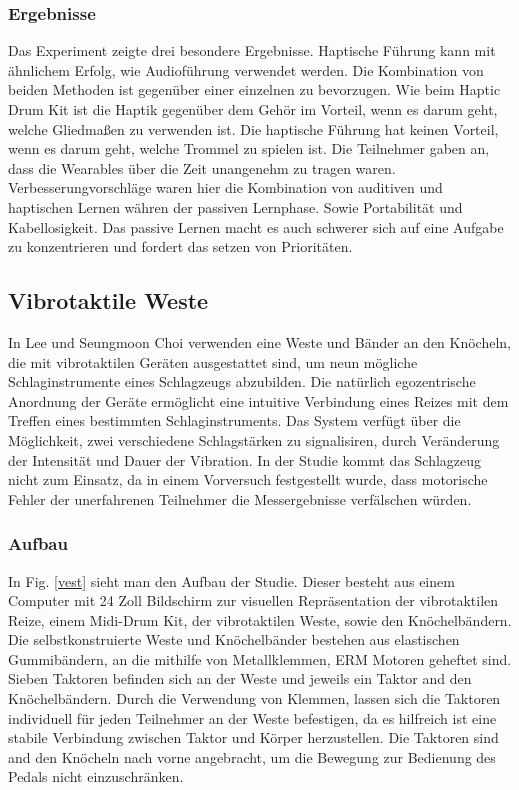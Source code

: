 \documentclass[ngerman,runningheads,a4paper]{llncs}
\begin{document}
\subsubsection{Ergebnisse}
Das Experiment zeigte drei besondere Ergebnisse.
Haptische Führung kann mit ähnlichem Erfolg, wie Audioführung verwendet werden.
Die Kombination von beiden Methoden ist gegenüber einer einzelnen zu bevorzugen.
Wie beim Haptic Drum Kit \cite{10.1145/1709886.1709892} ist die Haptik gegenüber dem Gehör im Vorteil, wenn es darum geht, welche Gliedmaßen zu verwenden ist.
Die haptische Führung hat keinen Vorteil, wenn es darum geht, welche Trommel zu spielen ist.
Die Teilnehmer gaben an, dass die Wearables über die Zeit unangenehm zu tragen waren.
Verbesserungvorschläge waren hier die Kombination von auditiven und haptischen Lernen währen der passiven Lernphase. Sowie Portabilität und Kabellosigkeit.
Das passive Lernen macht es auch schwerer sich auf eine Aufgabe zu konzentrieren und fordert das setzen von Prioritäten.

\subsection{Vibrotaktile Weste}
In Lee und Seungmoon Choi \cite{6775447} verwenden eine Weste und Bänder an den Knöcheln, die mit vibrotaktilen Geräten ausgestattet sind, um neun mögliche Schlaginstrumente eines Schlagzeugs abzubilden. Die natürlich egozentrische Anordnung der Geräte ermöglicht eine intuitive Verbindung eines Reizes mit dem Treffen eines bestimmten Schlaginstruments. Das System verfügt über die Möglichkeit, zwei verschiedene Schlagstärken zu signalisiren, durch Veränderung der Intensität und Dauer der Vibration. In der Studie kommt das Schlagzeug nicht zum Einsatz, da in einem Vorversuch festgestellt wurde, dass motorische Fehler der unerfahrenen Teilnehmer die Messergebnisse verfälschen würden.

\subsubsection{Aufbau}
In Fig. \ref{vest} sieht man den Aufbau der Studie. Dieser besteht aus einem Computer mit 24 Zoll Bildschirm zur visuellen Repräsentation der vibrotaktilen Reize, einem Midi-Drum Kit, der vibrotaktilen Weste, sowie den Knöchelbändern.
Die selbstkonstruierte Weste und Knöchelbänder bestehen aus elastischen Gummibändern, an die mithilfe von Metallklemmen, ERM Motoren geheftet sind. Sieben Taktoren befinden sich an der Weste und jeweils ein Taktor and den Knöchelbändern.
Durch die Verwendung von Klemmen, lassen sich die Taktoren individuell für jeden Teilnehmer an der Weste befestigen, da es hilfreich ist eine stabile Verbindung zwischen Taktor und Körper herzustellen.
Die Taktoren sind and den Knöcheln nach vorne angebracht, um die Bewegung zur Bedienung des Pedals nicht einzuschränken.
\end{document}
